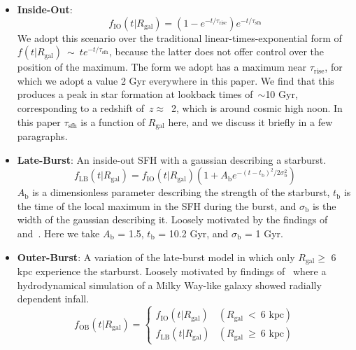 \documentclass[fleqn, usenatbib]{mnras}
\begin{document}
\begin{itemize}
\begin{itemize}
		\item \textbf{Inside-Out}: 
		\begin{equation} 
		f_\text{IO}(t|R_\text{gal}) = (1 - e^{-t/\tau_\text{rise}})
		e^{-t/\tau_\text{sfh}} 
		\label{eq:insideout_sfh} 
		\end{equation} 
		We adopt this scenario over the traditional linear-times-exponential 
		form of $f(t|R_\text{gal})~\sim~te^{-t/\tau_\text{sfh}}$, because the 
		latter does not offer control over the position of the maximum. The 
		form we adopt has a maximum near $\tau_\text{rise}$, for which we adopt 
		a value 2 Gyr everywhere in this paper. We find that this produces a 
		peak in star formation at lookback times of~$\sim$10 Gyr, corresponding 
		to a redshift of~$z \approx$~2, which is around cosmic high noon. In 
		this paper $\tau_\text{sfh}$ is a function of $R_\text{gal}$ here, and 
		we discuss it briefly in a few paragraphs. 

		\item \textbf{Late-Burst}: An inside-out SFH with a gaussian describing 
		a starburst. 
		\begin{equation} 
		f_\text{LB}(t|R_\text{gal}) = f_\text{IO}(t|R_\text{gal}) 
		(1 + A_\text{b}e^{-(t - t_\text{b})^2/2\sigma_\text{b}^2}) 
		\label{eq:lateburst_sfh} 
		\end{equation} 
		$A_\text{b}$ is a dimensionless parameter describing the strength of 
		the starburst, $t_\text{b}$ is the time of the local maximum in the SFH 
		during the burst, and $\sigma_\text{b}$ is the width of the gaussian 
		describing it. Loosely motivated by the findings of~\citet{Isern2019} 
		and~\citet{Mor2019}. Here we take $A_\text{b}$ = 1.5, $t_\text{b}$ = 
		10.2 Gyr, and $\sigma_\text{b}$ = 1 Gyr. 

		\item \textbf{Outer-Burst}: A variation of the late-burst model in 
		which only $R_\text{gal}\geq$ 6 kpc experience the starburst. Loosely 
		motivated by findings of~\citet{Vincenzo2020} where a hydrodynamical 
		simulation of a Milky Way-like galaxy showed radially dependent 
		infall. 
		\begin{equation} 
		f_\text{OB}(t|R_\text{gal}) = \begin{cases} 
		f_\text{IO}(t|R_\text{gal}) & (R_\text{gal}~<~\text{6 kpc}) \\ 
		f_\text{LB}(t|R_\text{gal}) & (R_\text{gal}~\geq~\text{6 kpc}) 
		\end{cases} 
		\label{eq:outerburst_sfh} 
		\end{equation} 


\end{itemize}
\end{itemize}
\end{document}
